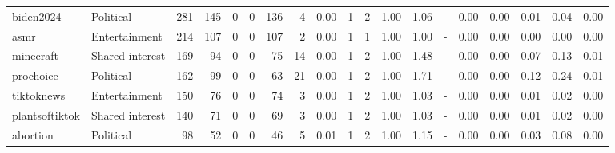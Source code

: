\begin{tabular}{llrrrrrrrrrrrrrrrrr}
       biden2024 &       Political &    281 &    145 &                           0 &                            0 &           136 &                          4 &     0.00 &    1 &      2 & 1.00 &   1.06 &                                - &   0.00 &         0.00 &                                0.01 &                                   0.04 &                                     0.00 \\
            asmr &   Entertainment &    214 &    107 &                           0 &                            0 &           107 &                          2 &     0.00 &    1 &      1 & 1.00 &   1.00 &                                - &   0.00 &         0.00 &                                0.00 &                                   0.00 &                                     0.00 \\
       minecraft & Shared interest &    169 &     94 &                           0 &                            0 &            75 &                         14 &     0.00 &    1 &      2 & 1.00 &   1.48 &                                - &   0.00 &         0.00 &                                0.07 &                                   0.13 &                                     0.01 \\
       prochoice &       Political &    162 &     99 &                           0 &                            0 &            63 &                         21 &     0.00 &    1 &      2 & 1.00 &   1.71 &                                - &   0.00 &         0.00 &                                0.12 &                                   0.24 &                                     0.01 \\
      tiktoknews &   Entertainment &    150 &     76 &                           0 &                            0 &            74 &                          3 &     0.00 &    1 &      2 & 1.00 &   1.03 &                                - &   0.00 &         0.00 &                                0.01 &                                   0.02 &                                     0.00 \\
  plantsoftiktok & Shared interest &    140 &     71 &                           0 &                            0 &            69 &                          3 &     0.00 &    1 &      2 & 1.00 &   1.03 &                                - &   0.00 &         0.00 &                                0.01 &                                   0.02 &                                     0.00 \\
        abortion &       Political &     98 &     52 &                           0 &                            0 &            46 &                          5 &     0.01 &    1 &      2 & 1.00 &   1.15 &                                - &   0.00 &         0.00 &                                0.03 &                                   0.08 &                                     0.00 \\

\end{tabular}
